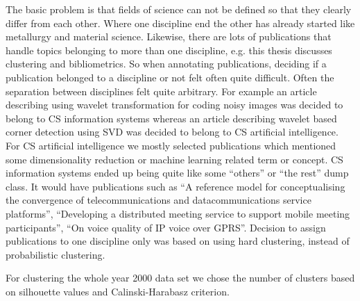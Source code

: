 The basic problem is that fields of science can not be 
defined so that they clearly differ from each other. Where one 
discipline end the other has already started like metallurgy and 
material science. Likewise, there are lots of publications that 
handle topics belonging to more than one discipline, e.g. this 
thesis discusses clustering and bibliometrics. So when annotating 
publications, deciding if a publication belonged to
a discipline or not felt often quite difficult. Often the 
separation between disciplines felt quite arbitrary. For example
an article describing using wavelet transformation for coding noisy
images was decided to belong to CS information systems whereas an
article describing wavelet based corner detection using SVD was
decided to belong to CS artificial intelligence.
For CS artificial intelligence we mostly selected publications 
which mentioned some dimensionality reduction or machine learning 
related term or concept. CS information systems ended up being 
quite like some ``others'' or ``the rest'' dump class.
It would have publications such as
``A reference model for conceptualising the convergence of 
telecommunications and datacommunications service platforms'',
``Developing a distributed meeting service to support mobile 
meeting participants'',
``On voice quality of IP voice over GPRS''.
Decision to assign publications to one discipline only was based 
on using hard clustering, instead of probabilistic clustering. 

For clustering the whole year 2000 data set we chose the number 
of clusters based on silhouette values and Calinski-Harabasz 
criterion.



